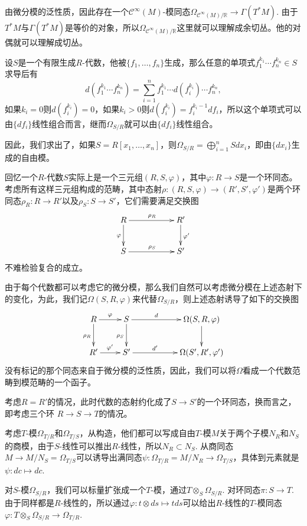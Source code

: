 由微分模的泛性质，因此存在一个$\mathcal{C}^\infty(M)$-模同态$\Omega_{\mathcal{C}^\infty(M)/\mathbb{R}}\to \Gamma(T^*M)$. 由于$T^*M$与$\Gamma(T^*M)$是等价的对象，所以$\Omega_{\mathcal{C}^\infty(M)/\mathbb{R}}$这里就可以理解成余切丛。他的对偶就可以理解成切丛。

\para 设$S$是一个有限生成$R$-代数，他被$\{f_1,\dots,f_n\}$生成，那么任意的单项式$f_1^{k_1}\cdots f_n^{k_n}\in S$求导后有
\[
	d(f_1^{k_1}\cdots f_n^{k_n})=\sum_{i=1}^n f_1^{k_1}\cdots d(f_i^{k_i})\cdots f_n^{k_n},
\]
如果$k_i=0$则$d(f_i^{k_i})=0$，如果$k_i>0$则$d(f_i^{k_i})=f_i^{k_i-1}df_i$，所以这个单项式可以由$\{df_i\}$线性组合而言，继而$\Omega_{S/R}$就可以由$\{df_i\}$线性组合。

因此，我们求出了，如果$S=R[x_1,\dots,x_n]$，则$\Omega_{S/R}=\bigoplus_{i=1}^n Sdx_i$，即由$\{dx_i\}$生成的自由模。

\para 回忆一个$R$-代数$S$实际上是一个三元组$(R,S,\varphi)$，其中$\varphi:R\to S$是一个环同态。考虑所有这样三元组构成的范畴，其中态射$\rho:(R,S,\varphi)\to (R',S',\varphi')$是两个环同态$\rho_R:R\to R'$以及$\rho_S:S\to S'$，它们需要满足交换图
\[
\begin{xy}
	\xymatrix
	{
		R\ar[rr]^{\rho_R} \ar[d]_{\varphi}&&R' \ar[d]^{\varphi'}\\
		S\ar[rr]^{\rho_S}&&S'
	}
\end{xy}
\]
不难检验复合的成立。

由于每个代数都可以考虑它的微分模，那么我们自然可以考虑微分模在上述态射下的变化，为此，我们记$\Omega(S,R,\varphi)$来代替$\Omega_{S/R}$，则上述态射诱导了如下的交换图
\[
\begin{xy}
	\xymatrix
	{
		R\ar[r]^{\varphi}\ar[d]_{\rho_R}&S\ar[rr]^-{d} \ar[d]_{\rho_S}&&\Omega(S,R,\varphi) \ar[d]\\
		R'\ar[r]^{\varphi'}&S'\ar[rr]^-{d'}&&\Omega(S',R',\varphi')
	}
\end{xy}
\]
没有标记的那个同态来自于微分模的泛性质，因此，我们可以将$\Omega$看成一个代数范畴到模范畴的一个函子。

\para 考虑$R=R'$的情况，此时代数的态射约化成了$S\to S'$的一个环同态，换而言之，即考虑三个环
$R\to S\to T$的情况。

考虑$T$-模$\Omega_{T/R}$和$\Omega_{T/S}$，从构造，他们都可以写成自由$T$-模$M$关于两个子模$N_R$和$N_S$的商模，由于$S$-线性可以推出$R$-线性，所以$N_R\subset N_S$. 从商同态$M\to M/N_S=\Omega_{T/S}$可以诱导出满同态$\psi:\Omega_{T/R}=M/N_R\to \Omega_{T/S}$，具体到元素就是$\psi:dc\mapsto dc$. 

对$S$-模$\Omega_{S/R}$，我们可以标量扩张成一个$T$-模，通过$T\otimes_S \Omega_{S/R}$. 对环同态$\pi:S\to T$. 由于同样都是$R$-线性的，所以通过$\varphi:t\otimes ds\mapsto tds$可以给出$R$-线性的$T$-模同态$\varphi:T\otimes_S \Omega_{S/R}\to \Omega_{T/R}$.

